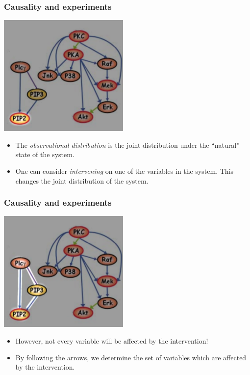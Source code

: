 \documentclass{beamer}
\begin{document}
\begin{frame}
\frametitle{Causality and experiments}
\begin{center}
\includegraphics[scale = 0.5]{../images/fig01_01.png}
\end{center}

\begin{itemize}
\item The \emph{observational distribution} is the joint distribution under the ``natural'' state of the system.
\item One can consider \emph{intervening} on one of the variables in the system.  This changes the joint distribution of the system.
\end{itemize}

\end{frame}

\begin{frame}
\frametitle{Causality and experiments}

\begin{center}
\includegraphics[scale = 0.5]{../images/fig01_02.png}
\end{center}

\begin{itemize}
\item However, not every variable will be affected by the intervention!
\item By following the arrows, we determine the set of variables which are affected by the intervention.
\end{itemize}

\end{frame}
\end{document}
